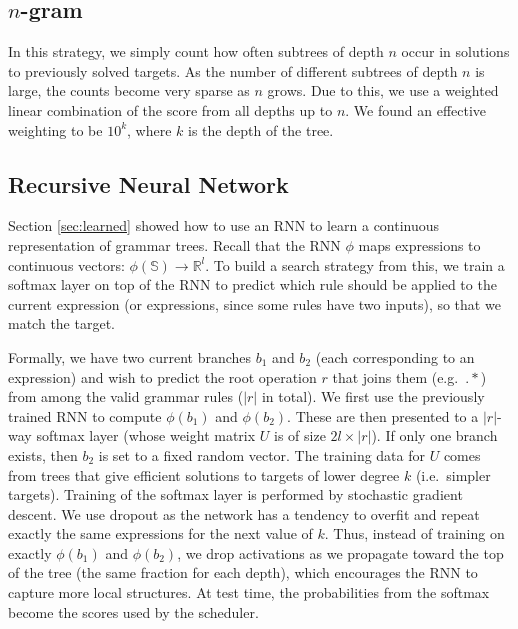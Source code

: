 \documentclass{article} %
\begin{document}
\vspace{-1mm}
\subsection{$n$-gram}
\vspace{-1mm}
In this strategy, we simply count how often subtrees of depth $n$
occur in solutions to previously solved targets. As the number of
different subtrees of depth $n$ is large, the counts become very
sparse as $n$ grows. Due to this, we use a weighted linear combination
of the score from all depths up to $n$. We found an effective
weighting to be $10^k$, where $k$ is the depth of the
tree. 

\vspace{-1mm}
\subsection{Recursive Neural Network}
\vspace{-1mm}
\label{sec:rnn}
Section \ref{sec:learned} showed how to use an RNN to learn a continuous
representation of grammar trees. Recall that the RNN $\phi$
maps expressions to continuous vectors: $\phi(\mathbb{S}) \rightarrow \mathbb{R}^l$.
To build a search strategy from this, we train a 
softmax layer on top of the RNN to predict which rule should be
applied to the current expression (or expressions, since some rules
have two inputs), so that we match the target.

Formally, we have two current branches $b_1$ and $b_2$ (each
corresponding to an expression) and wish to predict
the root operation $r$ that joins them (e.g.~$.*$) from among the
valid grammar rules ($|r|$ in total). We first use the previously trained RNN to compute 
$\phi(b_1)$ and $\phi(b_2)$. These are then presented to a $|r|$-way
softmax layer (whose weight matrix $U$ is of size $2l \times |r|$). 
If only one branch exists, then $b_2$ is set to a fixed random
vector. The training data for $U$ comes from trees that
give efficient solutions to targets of lower degree $k$ (i.e.~simpler
targets). Training of the softmax layer is performed by stochastic
gradient descent. We use dropout \cite{hinton2012improving} as the
network has a tendency to overfit and repeat exactly the same
expressions for the next value of $k$. Thus, instead of training on
exactly $\phi(b_1)$ and $\phi(b_2)$, we drop activations as we
propagate toward the top of the tree (the same fraction for each
depth), which encourages the RNN to capture more local structures.  At
test time, the probabilities from the softmax become the scores used
by the scheduler.
\end{document}
